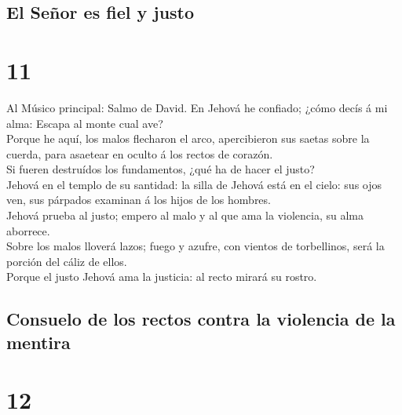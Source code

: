 \hypertarget{el-seuxf1or-es-fiel-y-justo}{%
\subsection{El Señor es fiel y
justo}\label{el-seuxf1or-es-fiel-y-justo}}

\hypertarget{section-19-11}{%
\section{11}\label{section-19-11}}

 Al Músico principal: Salmo de David. En Jehová he
confiado; ¿cómo decís á mi alma: Escapa al monte cual ave?\\
 Porque he aquí, los malos flecharon el arco, apercibieron
sus saetas sobre la cuerda, para asaetear en oculto á los rectos de
corazón.\\
 Si fueren destruídos los fundamentos, ¿qué ha de hacer el
justo?\\
 Jehová en el templo de su santidad: la silla de Jehová
está en el cielo: sus ojos ven, sus párpados examinan á los hijos de los
hombres.\\
 Jehová prueba al justo; empero al malo y al que ama la
violencia, su alma aborrece.\\
 Sobre los malos lloverá lazos; fuego y azufre, con
vientos de torbellinos, será la porción del cáliz de ellos.\\
 Porque el justo Jehová ama la justicia: al recto mirará
su rostro.

\hypertarget{consuelo-de-los-rectos-contra-la-violencia-de-la-mentira}{%
\subsection{Consuelo de los rectos contra la violencia de la
mentira}\label{consuelo-de-los-rectos-contra-la-violencia-de-la-mentira}}

\hypertarget{section-19-12}{%
\section{12}\label{section-19-12}}

